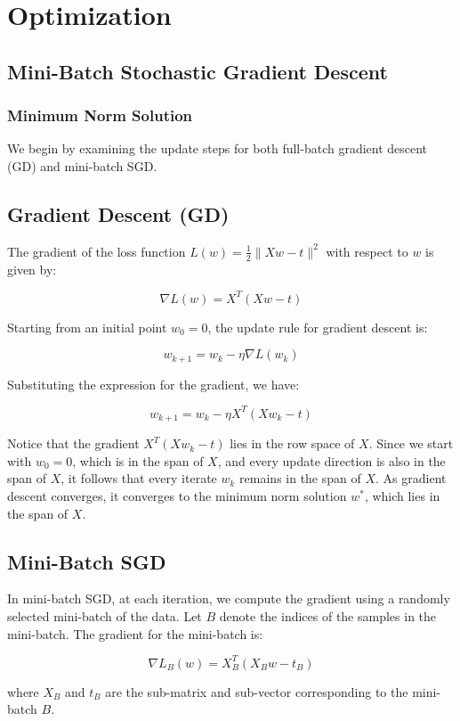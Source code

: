 \section{Optimization}
\subsection{Mini-Batch Stochastic Gradient Descent}
\subsubsection{Minimum Norm Solution}
We begin by examining the update steps for both full-batch gradient descent (GD) and mini-batch SGD.

\subsection*{Gradient Descent (GD)}

The gradient of the loss function \( L(w) = \frac{1}{2} \|Xw - t\|^2 \) with respect to \( w \) is given by:

\[
\nabla L(w) = X^T (Xw - t)
\]

Starting from an initial point \( w_0 = 0 \), the update rule for gradient descent is:

\[
w_{k+1} = w_k - \eta \nabla L(w_k)
\]

Substituting the expression for the gradient, we have:

\[
w_{k+1} = w_k - \eta X^T (Xw_k - t)
\]

Notice that the gradient \( X^T (Xw_k - t) \) lies in the row space of \( X \). Since we start with \( w_0 = 0 \), which is in the span of \( X \), and every update direction is also in the span of \( X \), it follows that every iterate \( w_k \) remains in the span of \( X \). As gradient descent converges, it converges to the minimum norm solution \( w^* \), which lies in the span of \( X \).

\subsection*{Mini-Batch SGD}

In mini-batch SGD, at each iteration, we compute the gradient using a randomly selected mini-batch of the data. Let \( B \) denote the indices of the samples in the mini-batch. The gradient for the mini-batch is:

\[
\nabla L_B(w) = X_B^T (X_B w - t_B)
\]

where \( X_B \) and \( t_B \) are the sub-matrix and sub-vector corresponding to the mini-batch \( B \).


